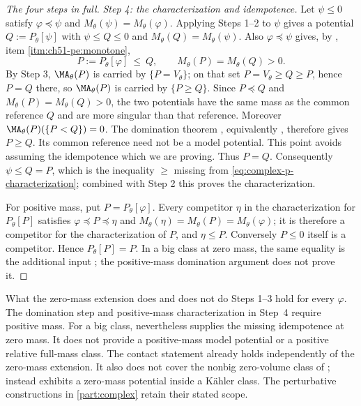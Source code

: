 \begin{proof}[The four steps in full]
\emph{Step 4: the characterization and idempotence.}  Let $\psi\leq0$
satisfy $\varphi\preceq\psi$ and
$M_\theta(\psi)=M_\theta(\varphi)$.  Applying Steps 1--2 to $\psi$
gives a potential $Q:=P_\theta[\psi]$ with
$\psi\leq Q\leq0$ and $M_\theta(Q)=M_\theta(\psi)$.  Also
$\varphi\preceq\psi$ gives, by
, item \cref{itm:ch51-pe:monotone},
\[
 P:=P_\theta[\varphi]\ \leq\ Q,
 \qquad
 M_\theta(P)=M_\theta(Q)>0 .
\]
By Step 3, $\MA_\theta(P)$ is carried by $\{P=V_\theta\}$; on that
set $P=V_\theta\geq Q\geq P$, hence $P=Q$ there, so
$\MA_\theta(P)$ is carried by $\{P\geq Q\}$.  Since $P\preceq Q$ and $M_\theta(P)=M_\theta(Q)>0$, the two
potentials have the same mass as the common reference $Q$ and are more
singular than that reference.  Moreover
$\MA_\theta(P)(\{P<Q\})=0$.  The domination theorem
\cite[Proposition~3.11]{DDNL18mono}, equivalently
\cite[Theorem~2.4.5]{XiaBook}, therefore gives $P\geq Q$.
Its common reference need not be a model potential.  This point avoids
assuming the idempotence which we are proving.  Thus $P=Q$.
Consequently $\psi\leq Q=P$, which is the inequality
$\geq$ missing from \eqref{eq:complex-p-characterization}; combined
with Step 2 this proves the characterization.

For positive mass, put $P=P_\theta[\varphi]$.  Every competitor
$\eta$ in the characterization for $P_\theta[P]$ satisfies
$\varphi\preceq P\preceq\eta$ and
$M_\theta(\eta)=M_\theta(P)=M_\theta(\varphi)$; it is therefore a
competitor for the characterization of $P$, and $\eta\leq P$.
Conversely $P\leq0$ itself is a competitor.  Hence $P_\theta[P]=P$.
In a big class at zero mass, the same equality is the additional input
\cite[Theorem~1.2]{PSWZ26}; the positive-mass domination argument does
not prove it.
\end{proof}

\par\noindent\begin{minipage}{\textwidth}
\begin{warning}{What the zero-mass extension does and does not do}
\label{warn:ch51-p-positive-mass}
Steps 1--3 hold for every $\varphi$.  The domination step and
positive-mass characterization in Step~4 require positive mass.
For a big class, \cite[Theorem~1.2]{PSWZ26} nevertheless supplies the
missing idempotence at zero mass.  It does not provide a positive-mass
model potential or a positive relative full-mass class.  The contact
statement already holds independently of the zero-mass extension.  It also does not cover the nonbig
zero-volume class of ;
 instead exhibits a zero-mass potential inside a
K\"ahler class.  The perturbative constructions in
\cref{part:complex} retain their stated scope.
\end{warning}
\end{minipage}\par\medskip

